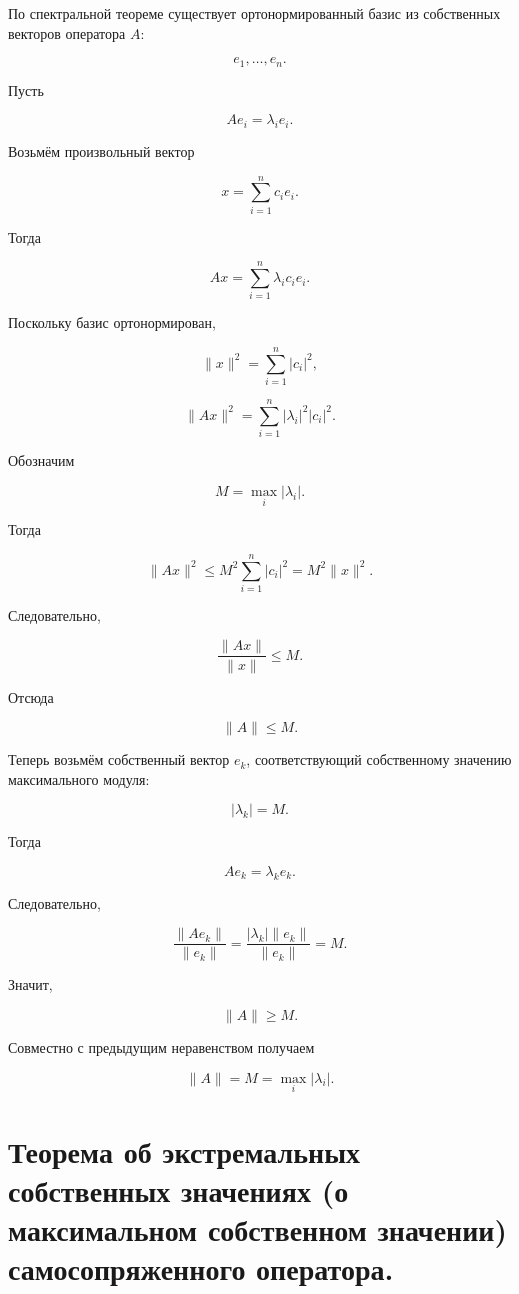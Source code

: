 \documentclass[14pt]{extreport}
\begin{document}
\begin{prbox}

По спектральной теореме существует ортонормированный базис из собственных векторов оператора \(A\):

\[
e_1,\ldots,e_n.
\]

Пусть

\[
Ae_i=\lambda_i e_i.
\]

Возьмём произвольный вектор

\[
x=\sum_{i=1}^{n}c_i e_i.
\]

Тогда

\[
Ax=\sum_{i=1}^{n}\lambda_i c_i e_i.
\]

Поскольку базис ортонормирован,

\[
\|x\|^2
=
\sum_{i=1}^{n}|c_i|^2,
\]

\[
\|Ax\|^2
=
\sum_{i=1}^{n}|\lambda_i|^2|c_i|^2.
\]

Обозначим

\[
M=\max_i |\lambda_i|.
\]

Тогда

\[
\|Ax\|^2
\le
M^2
\sum_{i=1}^{n}|c_i|^2
=
M^2\|x\|^2.
\]

Следовательно,

\[
\frac{\|Ax\|}{\|x\|}
\le
M.
\]

Отсюда

\[
\|A\|\le M.
\]

Теперь возьмём собственный вектор \(e_k\), соответствующий собственному значению максимального модуля:

\[
|\lambda_k|=M.
\]

Тогда

\[
Ae_k=\lambda_k e_k.
\]

Следовательно,

\[
\frac{\|Ae_k\|}{\|e_k\|}
=
\frac{|\lambda_k|\|e_k\|}{\|e_k\|}
=
M.
\]

Значит,

\[
\|A\|\ge M.
\]

Совместно с предыдущим неравенством получаем

\[
\|A\|=M
=
\max_i |\lambda_i|.
\]

\end{prbox}

\chapter{Теорема об экстремальных собственных значениях (о максимальном собственном значении) самосопряженного оператора.}
\end{document}
